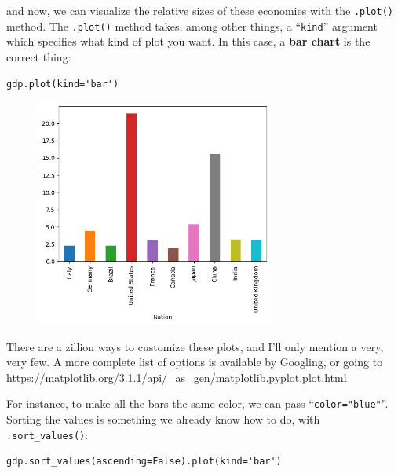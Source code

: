 
and now, we can visualize the relative sizes of these economies with the
\texttt{.plot()} method. The \texttt{.plot()} method takes, among other things,
a ``\texttt{kind}'' argument which specifies what kind of plot you want. In
this case, a \textbf{bar chart} is the correct thing:

\begin{Verbatim}[fontsize=\small,samepage=true,frame=single,framesep=3mm]
gdp.plot(kind='bar')
\end{Verbatim}

\begin{figure}[ht]
\centering
\includegraphics[width=0.7\textwidth]{gdp.png}
\end{figure}

There are a zillion ways to customize these plots, and I'll only mention a
very, very few. A more complete list of options is available by Googling, or
going to \url{https://matplotlib.org/3.1.1/api/\_as\_gen/matplotlib.pyplot.plot.html}


For instance, to make all the bars the same color, we can pass
``\texttt{color="blue"}''. Sorting the values is something we already know how
to do, with \texttt{.sort\_values()}:

\begin{Verbatim}[fontsize=\small,samepage=true,frame=single,framesep=3mm]
gdp.sort_values(ascending=False).plot(kind='bar')
\end{Verbatim}

